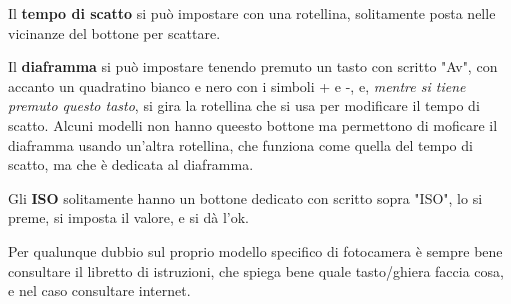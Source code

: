 Il \textbf{tempo di scatto} si può impostare con una rotellina, solitamente posta nelle vicinanze del bottone per scattare.

Il \textbf{diaframma} si può impostare tenendo premuto un tasto con scritto "Av", con accanto un quadratino bianco e nero con i simboli + e -, e, \textit{mentre si tiene premuto questo tasto}, si gira la rotellina che si usa per modificare il tempo di scatto.
Alcuni modelli non hanno queesto bottone ma permettono di moficare il diaframma usando un'altra rotellina, che funziona come quella del tempo di scatto, ma che è dedicata al diaframma.

Gli \textbf{ISO} solitamente hanno un bottone dedicato con scritto sopra "ISO", lo si preme, si imposta il valore, e si dà l'ok.

Per qualunque dubbio sul proprio modello specifico di fotocamera è sempre bene consultare il libretto di istruzioni, che spiega bene quale tasto/ghiera faccia cosa, e nel caso consultare internet.